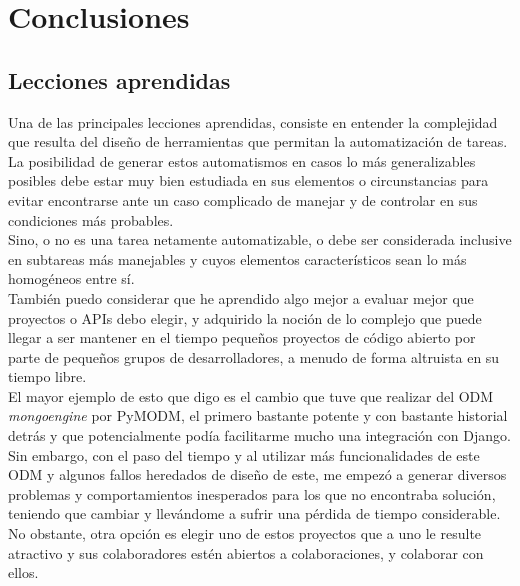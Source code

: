 \cleardoublepage
\chapter{Conclusiones}
\label{chap:conclusiones}

\section{Lecciones aprendidas}

Una de las principales lecciones aprendidas, consiste en entender la complejidad que resulta del diseño de herramientas que permitan la automatización de tareas.\\


La posibilidad de generar estos automatismos en casos lo más generalizables posibles debe estar muy bien estudiada en sus elementos o circunstancias para evitar encontrarse ante un caso complicado de manejar y de controlar en sus condiciones más probables.\\


Sino, o no es una tarea netamente automatizable, o debe ser considerada inclusive en subtareas más manejables y cuyos elementos característicos sean lo más homogéneos entre sí.\\


También puedo considerar que he aprendido algo mejor a evaluar mejor que proyectos o APIs debo elegir, y adquirido la noción de lo complejo que puede llegar a ser mantener en el tiempo pequeños proyectos de código abierto por parte de pequeños grupos de desarrolladores, a menudo de forma altruista en su tiempo libre.\\


El mayor ejemplo de esto que digo es el cambio que tuve que realizar del ODM \textit{mongoengine} por PyMODM, el primero bastante potente y con bastante historial detrás y que potencialmente podía facilitarme mucho una integración con Django.\\


Sin embargo, con el paso del tiempo y al utilizar más funcionalidades de este ODM y algunos fallos heredados de diseño de este, me empezó a generar diversos problemas y comportamientos inesperados para los que no encontraba solución, teniendo que cambiar y llevándome a sufrir una pérdida de tiempo considerable.\\


No obstante, otra opción es elegir uno de estos proyectos que a uno le resulte atractivo y sus colaboradores estén abiertos a colaboraciones, y colaborar con ellos.\\


